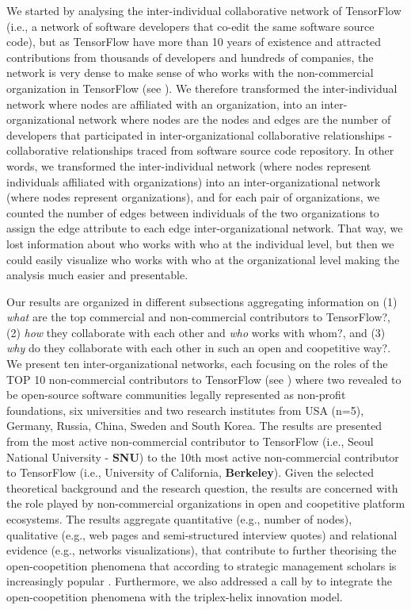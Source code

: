 \documentclass[CHICAGO,Times1COL]{WileyNJDv5} %
\begin{document}
We started by analysing the inter-individual collaborative network of TensorFlow (i.e., a network of software developers that co-edit the same software source code), but as TensorFlow have more than 10 years of existence and attracted contributions from thousands of developers and hundreds of companies, the network is very dense to make sense of who works with the non-commercial organization in TensorFlow (see ). We therefore transformed the inter-individual network where nodes are affiliated with an organization, into an inter-organizational network where nodes are the nodes and edges are the number of developers that participated in inter-organizational collaborative relationships - collaborative relationships traced from software source code repository. In other words, we transformed the inter-individual network (where nodes represent individuals affiliated with organizations) into an inter-organizational network (where nodes represent organizations), and for each pair of organizations, we counted the number of edges between individuals of the two organizations to assign the edge attribute to each edge inter-organizational network. That way, we lost information about who works with who at the individual level, but then we could easily visualize who works with who at the organizational level making the analysis much easier and presentable. 

Our results are organized in different subsections aggregating information on (1) \textit{what} are the top commercial and non-commercial contributors to TensorFlow?, (2) \textit{how} they collaborate with each other and \textit{who} works with whom?, and (3) \textit{why} do they collaborate with each other in such an open and coopetitive way?. We present ten inter-organizational networks, each focusing on the roles of the TOP 10 non-commercial contributors to TensorFlow (see ) where two revealed to be open-source software communities legally represented as non-profit foundations,   six universities and two research institutes from USA (n=5), Germany, Russia, China, Sweden and South Korea. The results are presented from the most active non-commercial contributor to TensorFlow  (i.e., Seoul National University - \textbf{SNU}) to the 10th most active non-commercial contributor to TensorFlow (i.e., University of California, \textbf{Berkeley}).  Given the selected theoretical background and the research question, the results are concerned with the role played by non-commercial organizations  in open and coopetitive platform ecosystems. The results aggregate quantitative (e.g., number of nodes), qualitative (e.g., web pages and semi-structured interview quotes) and relational evidence (e.g., networks visualizations), that contribute to further theorising the open-coopetition phenomena that according to strategic management scholars is increasingly popular \citep{CzakonSrivastava_et_al2020}. Furthermore, we also addressed a call by \citet{RothLeydesdorff_et_al2020} to  integrate the open-coopetition phenomena with the triplex-helix innovation model. 
\end{document}
